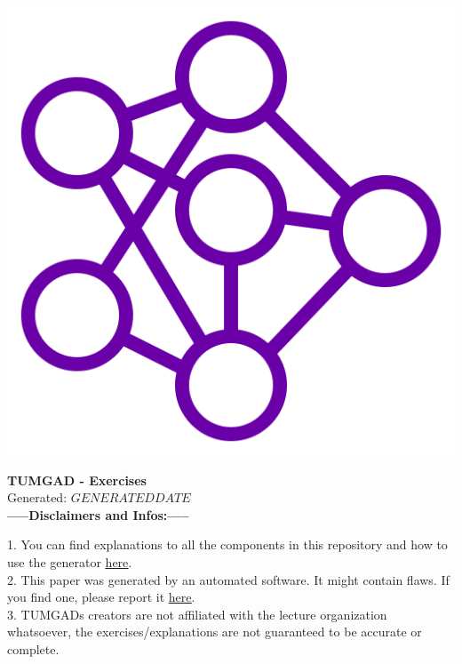 \documentclass[12pt]{article}
\begin{document}
    \begin{center}
        \includegraphics[scale=0.25]{favicon.png} %
        \vspace{15px}

        {\selectfont
            \textbf{\LARGE{TUMGAD - Exercises}}\\
        Generated: $GENERATEDDATE$\\
        }
        \vspace{20px}
        \textbf{\LARGE{-----Disclaimers and Infos:-----}}
        \\[0.2in]
    \end{center}
    1. You can find explanations to all the components in this repository and how to use the generator \href{https://sebastianoner.github.io/TUMGAD/src/routes}{\underline{here}}.
    \\[0.2in]
    2. This paper was generated by an automated software.
    It might contain flaws.
    If you find one, please report it \href{https://github.com/SebastianOner/TUMGAD/issues/new?assignees=&labels=&template=bug_report.md&title=}{\underline{here}}.
    \\[0.2in]
    3. TUMGADs creators are not affiliated with the lecture organization whatsoever, the exercises/explanations are not
    guaranteed to be accurate or complete.
\end{document}
